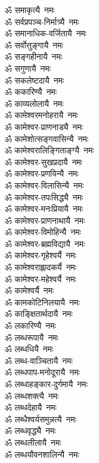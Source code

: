 \begin{multicols}{2}
\begin{flushleft}
ॐ समाकृत्यै~नमः\\
ॐ सर्वप्रपञ्च-निर्मात्र्यै~नमः\\
ॐ समानाधिक-वर्जितायै~नमः\\
ॐ सर्वोत्तुङ्गायै~नमः\\
ॐ सङ्गहीनायै~नमः\\
ॐ सगुणायै~नमः\\
ॐ सकलेष्टदायै~नमः\hfill {}\\
ॐ ककारिण्यै~नमः\\
ॐ काव्यलोलायै~नमः\\
ॐ कामेश्वरमनोहरायै~नमः\\
ॐ कामेश्वर-प्राणनाड्यै~नमः\\
ॐ कामेशोत्सङ्गवासिन्यै~नमः\\
ॐ कामेश्वरालिङ्गिताङ्ग्यै~नमः\\
ॐ कामेश्वर-सुखप्रदायै~नमः\\
ॐ कामेश्वर-प्रणयिन्यै~नमः\\
ॐ कामेश्वर-विलासिन्यै~नमः\\
ॐ कामेश्वर-तपःसिद्ध्यै~नमः\hfill {}\\
ॐ कामेश्वर-मनःप्रियायै~नमः\\
ॐ कामेश्वर-प्राणनाथायै~नमः\\
ॐ कामेश्वर-विमोहिन्यै~नमः\\
ॐ कामेश्वर-ब्रह्मविद्यायै~नमः\\
ॐ कामेश्वर-गृहेश्वर्यै~नमः\\
ॐ कामेश्वराह्लादकर्यै~नमः\\
ॐ कामेश्वर-महेश्वर्यै~नमः\\
ॐ कामेश्वर्यै~नमः\\
ॐ कामकोटिनिलयायै~नमः\\
ॐ काङ्क्षितार्थदायै~नमः\hfill {}\\
ॐ लकारिण्यै~नमः\\
ॐ लब्धरूपायै~नमः\\
ॐ लब्धधियै~नमः\\
ॐ लब्ध-वाञ्चितायै~नमः\\
ॐ लब्धपाप-मनोदूरायै~नमः\\
ॐ लब्धाहङ्कार-दुर्गमायै~नमः\\
ॐ लब्धशक्त्यै~नमः\\
ॐ लब्धदेहायै~नमः\\
ॐ लब्धैश्वर्यसमुन्नत्यै~नमः\\
ॐ लब्धवृद्ध्यै~नमः\hfill {}\\
ॐ लब्धलीलायै~नमः\\
ॐ लब्धयौवनशालिन्यै~नमः\\

\end{flushleft}
\end{multicols}
